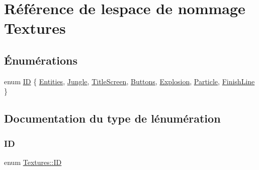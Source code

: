 \hypertarget{namespace_textures}{}\section{Référence de l\textquotesingle{}espace de nommage Textures}
\label{namespace_textures}
\subsection*{Énumérations}
\begin{DoxyCompactItemize}
\item 
enum \hyperlink{namespace_textures_a2cfe2099537d4e80b08437b4978301a5}{ID} \{ \newline
\hyperlink{namespace_textures_a2cfe2099537d4e80b08437b4978301a5ad0c915144f73c60a426e3488286b49b9}{Entities}, 
\hyperlink{namespace_textures_a2cfe2099537d4e80b08437b4978301a5af79bb5387a9162e951b2466c23788dfe}{Jungle}, 
\hyperlink{namespace_textures_a2cfe2099537d4e80b08437b4978301a5ae36e9d9ef3bd838c5d625da49a0e9922}{Title\+Screen}, 
\hyperlink{namespace_textures_a2cfe2099537d4e80b08437b4978301a5a64224ec1e7cf592c8b9a0bb1aec67622}{Buttons}, 
\newline
\hyperlink{namespace_textures_a2cfe2099537d4e80b08437b4978301a5a7009ad86da42d4a7f86e95b9529f9bf9}{Explosion}, 
\hyperlink{namespace_textures_a2cfe2099537d4e80b08437b4978301a5a786a9eeed4131b86f75945a22fc14f8b}{Particle}, 
\hyperlink{namespace_textures_a2cfe2099537d4e80b08437b4978301a5ad965a9bb769ff8172e48b6acbd06c27b}{Finish\+Line}
 \}
\end{DoxyCompactItemize}


\subsection{Documentation du type de l\textquotesingle{}énumération}
\hypertarget{namespace_textures_a2cfe2099537d4e80b08437b4978301a5}{}\label{namespace_textures_a2cfe2099537d4e80b08437b4978301a5} 
\subsubsection{\texorpdfstring{ID}{ID}}
{\footnotesize\ttfamily enum \hyperlink{namespace_textures_a2cfe2099537d4e80b08437b4978301a5}{Textures\+::\+ID}}

